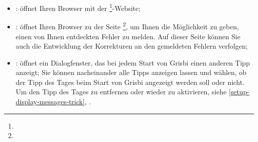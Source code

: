\begin{itemize}
\item {}: öffnet Ihren Browser mit der \footnote{\urlGrisbi{}}-Website;	
\item {}: öffnet Ihren Browser zu der Seite \footnote{\urlBugTracker{}}, um Ihnen die Möglichkeit zu geben, einen von Ihnen entdeckten Fehler zu melden. Auf dieser Seite können Sie auch die Entwicklung der Korrekturen an den gemeldeten Fehlern verfolgen;
\item {}: öffnet ein Dialogfenster, das bei jedem Start von Grisbi einen anderen Tipp anzeigt; Sie können nacheinander alle Tipps anzeigen lassen und wählen, ob der Tipp des Tages beim Start von Grisbi angezeigt werden soll oder nicht. Um den Tipp des Tages zu entfernen oder wieder zu aktivieren, siehe \vref{setup-display-messages-trick}, .
\end{itemize}

